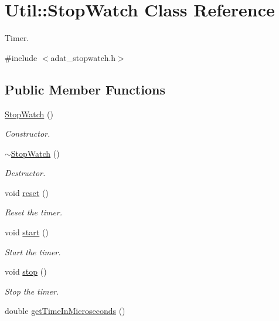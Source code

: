 \hypertarget{classUtil_1_1StopWatch}{}\section{Util\+:\+:Stop\+Watch Class Reference}
\label{classUtil_1_1StopWatch}


Timer.  




{\ttfamily \#include $<$adat\+\_\+stopwatch.\+h$>$}

\subsection*{Public Member Functions}
\begin{DoxyCompactItemize}
\item 
\mbox{\hyperlink{classUtil_1_1StopWatch_a7eeb59348e5efff8490d2e8e95b0f126}{Stop\+Watch}} ()
\begin{DoxyCompactList}\small\item\em Constructor. \end{DoxyCompactList}\item 
\mbox{\hyperlink{classUtil_1_1StopWatch_a149387c10f6c5da60cfde6de5173278b}{$\sim$\+Stop\+Watch}} ()
\begin{DoxyCompactList}\small\item\em Destructor. \end{DoxyCompactList}\item 
void \mbox{\hyperlink{classUtil_1_1StopWatch_a59e537525567ed9e0701635fb60148b7}{reset}} ()
\begin{DoxyCompactList}\small\item\em Reset the timer. \end{DoxyCompactList}\item 
void \mbox{\hyperlink{classUtil_1_1StopWatch_a87db8057d5ddf177cfcc9ae497337d13}{start}} ()
\begin{DoxyCompactList}\small\item\em Start the timer. \end{DoxyCompactList}\item 
void \mbox{\hyperlink{classUtil_1_1StopWatch_a8a89a1d02ece7c671ee1d9e9f42c88b2}{stop}} ()
\begin{DoxyCompactList}\small\item\em Stop the timer. \end{DoxyCompactList}\item 
double \mbox{\hyperlink{classUtil_1_1StopWatch_ab4de18812edf2336f96c52afcb0386b6}{get\+Time\+In\+Microseconds}} ()

\end{DoxyCompactItemize}
